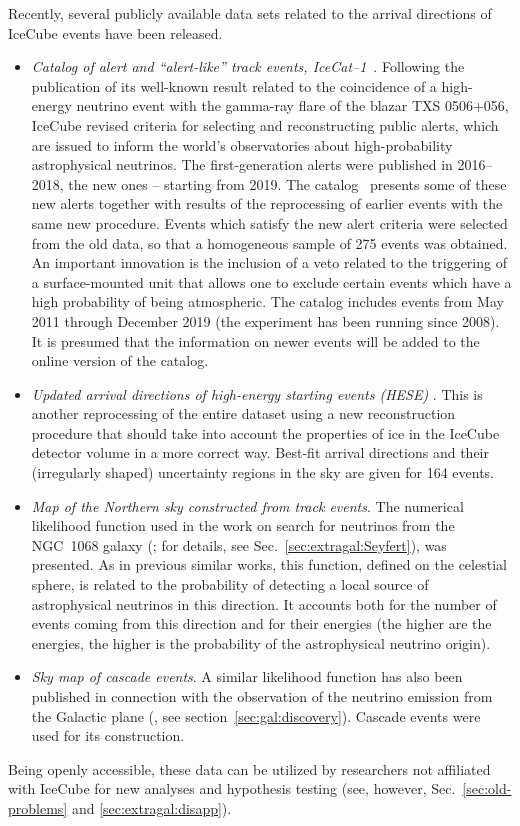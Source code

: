 \documentclass[a4paper,noshowpacs,noshowkeys,floatfix,twocolumn,preprintnumbers,nofootinbib]{revtex4-2}
\begin{document}
Recently, several publicly available data sets related to the arrival directions of IceCube events have been released.
\begin{itemize}
 \item
\textit{Catalog of alert and ``alert-like'' track events,
IceCat--1}~\cite{IceCat}. Following the publication of its well-known result \cite{IceCube-TXS0506gamma} related to the coincidence of a high-energy neutrino event with the gamma-ray flare of the blazar TXS 0506+056, IceCube revised criteria for selecting and reconstructing public alerts, which are issued to inform the world's observatories about high-probability astrophysical neutrinos. The first-generation alerts were published in 2016--2018, the new ones -- starting from 2019. The catalog~\cite{IceCat} presents some of these new alerts together with results of the reprocessing of earlier events with the same new procedure. Events which satisfy the new alert criteria were selected from the old data, so that a homogeneous sample of 275 events was obtained. An important innovation is the inclusion of a veto related to the triggering of a surface-mounted unit that allows one to exclude certain events which have a high probability of being atmospheric. The catalog includes events from May 2011 through December 2019 (the experiment has been running since 2008). It is presumed that the information on newer events will be added to the online version of the catalog.
\item
\textit{Updated arrival directions of high-energy starting events (HESE)} \cite{IceCube-newHESEdirections}. 
This is another reprocessing of the entire dataset using a new reconstruction procedure that should take into account the properties of ice in the IceCube detector volume in a more correct way. Best-fit arrival directions and their (irregularly shaped) uncertainty regions in the sky are given for 164 events.
\item
\textit{Map of the Northern sky constructed from track events}. The numerical likelihood function used in the work on search for neutrinos from the NGC~1068 galaxy (\cite{IceCube-NGC1068}; for details, see Sec.~\ref{sec:extragal:Seyfert}), was presented. As in previous similar works, this function, defined on the celestial sphere, is related to the probability of detecting a local source of astrophysical neutrinos in this direction. It accounts both for the number of events coming from this direction and for their energies (the higher are the energies, the higher is the probability of the astrophysical neutrino origin).
\item
\textit{Sky map of cascade events}.
A similar likelihood function has also been published in connection with the observation of the neutrino emission from the Galactic plane (\cite{IceCube-gal-Science}, see section~\ref{sec:gal:discovery}). Cascade events were used for its construction.
\end{itemize}
Being openly accessible, these data can be utilized by researchers not affiliated with IceCube for new analyses and hypothesis testing (see, however, Sec.\ \ref{sec:old-problems} and \ref{sec:extragal:disapp}).
\end{document}
